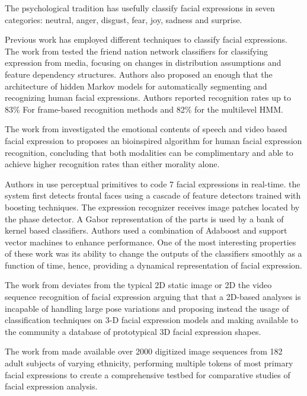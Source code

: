 \documentclass[]{article}
\begin{document}
The psychological tradition has usefully classify facial expressions in seven categories: neutral, anger, disgust, fear,
joy, sadness and surprise.


Previous work has employed different techniques to classify  facial expressions. The work from \cite{Cohen2003160}
tested the friend nation network classifiers for classifying expression from media, focusing on changes in distribution
assumptions and feature dependency structures. Authors also proposed an enough that the architecture of hidden Markov
models for automatically segmenting and recognizing human facial expressions. Authors reported recognition rates up to
83\% For frame-based recognition methods and 82\% for the multilevel HMM. 
 

The work from \cite{Chen670976} investigated the emotional contents of speech and video based facial expression to
proposes an bioinspired algorithm for human facial expression recognition, concluding that both modalities can be
complimentary and able to achieve higher recognition rates than either morality alone.


Authors in \cite{Bartlett4624313} use perceptual primitives to code 7 facial expressions in real-time. the system first
detects frontal faces using a cascade of feature detectors trained with boosting techniques. The expression recognizer
receives image patches located by the phase detector. A Gabor representation of the parts is used  by a bank of kernel
based classifiers. Authors used a combination of Adaboost and support vector machines to enhance performance. One of the
most interesting properties of these work was its ability to change the outputs of the classifiers smoothly as a
function of time, hence, providing a dynamical representation of facial expression.

The work from \cite{lijunyin} deviates from the typical 2D static image or 2D the video sequence recognition of
facial expression arguing that that a 2D-based analyses is incapable of handling large pose variations and proposing
instead the usage of classification techniques on 3-D facial expression models and making available to the community a
database of prototypical 3D facial expression shapes.
 
The work from \cite{Cohn840611} made available over 2000 digitized image sequences from  182 adult subjects of
varying ethnicity, performing multiple tokens of most primary facial expressions to create a comprehensive testbed for
comparative studies of facial expression analysis.
\end{document}
